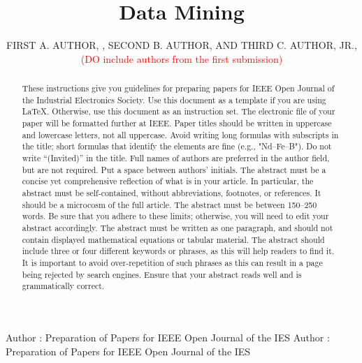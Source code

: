 \documentclass{ieeeojies}
\begin{document}
\title{Data Mining}
\author{\uppercase{First A. Author}, ,
\uppercase{Second B. Author, and Third C. Author,
Jr}.,
 \textcolor{red}{(DO include authors from the first submission)}}
\address[1]{National Institute of Standards and
Technology, Boulder, CO 80305 USA (e-mail: author@boulder.nist.gov)}
\address[2]{Department of Physics, Colorado State University, Fort Collins,
CO 80523 USA (e-mail: author@lamar.colostate.edu)}
\address[3]{Electrical Engineering Department, University of Colorado, Boulder, CO
80309 USA}

\markboth
{Author \headeretal: Preparation of Papers for IEEE Open Journal of the IES}
{Author \headeretal: Preparation of Papers for IEEE Open Journal of the IES}


\begin{abstract}
These instructions give you guidelines for preparing papers for
IEEE Open Journal of the Industrial Electronics Society. Use this document as a template if you are
using \LaTeX. Otherwise, use this document as an
instruction set. The electronic file of your paper will be formatted further
at IEEE. Paper titles should be written in uppercase and lowercase letters,
not all uppercase. Avoid writing long formulas with subscripts in the title;
short formulas that identify the elements are fine (e.g., "Nd--Fe--B"). Do
not write ``(Invited)'' in the title. Full names of authors are preferred in
the author field, but are not required. Put a space between authors'
initials. The abstract must be a concise yet comprehensive reflection of
what is in your article. In particular, the abstract must be self-contained,
without abbreviations, footnotes, or references. It should be a microcosm of
the full article. The abstract must be between 150--250 words. Be sure that
you adhere to these limits; otherwise, you will need to edit your abstract
accordingly. The abstract must be written as one paragraph, and should not
contain displayed mathematical equations or tabular material. The abstract
should include three or four different keywords or phrases, as this will
help readers to find it. It is important to avoid over-repetition of such
phrases as this can result in a page being rejected by search engines.
Ensure that your abstract reads well and is grammatically correct.
\end{abstract}
\end{document}
